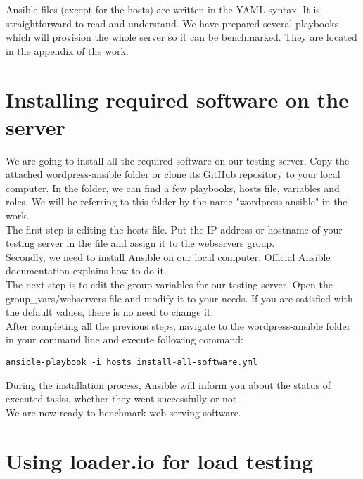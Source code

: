 Ansible files (except for the hosts) are written in the YAML syntax. It is straightforward to read and understand. We have prepared several playbooks which will provision the whole server so it can be benchmarked. They are located in the appendix of the work.

\section{Installing required software on the server}

We are going to install all the required software on our testing server. Copy the attached wordpress-ansible folder or clone its GitHub \cite{GitHub:WordPress-Ansible} repository to your local computer. In the folder, we can find a few playbooks, hosts file, variables and roles. We will be referring to this folder by the name "wordpress-ansible" in the work. \\

The first step is editing the hosts file. Put the IP address or hostname of your testing server in the file and assign it to the webservers group. \\

Secondly, we need to install Ansible on our local computer. Official Ansible documentation \cite{Ansible:install} explains how to do it. \\

The next step is to edit the group variables for our testing server. Open the group\_vars/webservers file and modify it to your needs. If you are satisfied with the default values, there is no need to change it. \\

After completing all the previous steps, navigate to the wordpress-ansible folder in your command line and execute following command:

\begin{lstlisting}
ansible-playbook -i hosts install-all-software.yml
\end{lstlisting}

During the installation process, Ansible will inform you about the status of executed tasks, whether they went successfully or not. \\

We are now ready to benchmark web serving software.

\section{Using loader.io for load testing}

